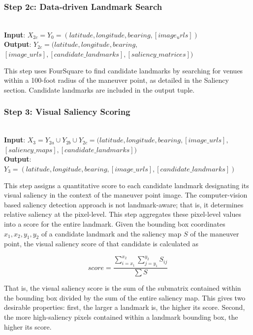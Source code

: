 \subsubsection*{Step 2c: Data-driven Landmark Search}~\\
\textbf{Input}: $X_{2c} = Y_0 = (latitude, longitude, bearing, [image_urls])$\\
\noindent\textbf{Output}: $Y_{2c} = (latitude, longitude, bearing,$ \\ $[image\_urls], [candidate\_landmarks], [saliency\_matrices] )$

This step uses FourSquare to find candidate landmarks by searching for venues within a 100-foot radius of the maneuver point, as detailed in the Saliency section. Candidate landmarks are included in the output tuple.

\subsubsection*{Step 3: Visual Saliency Scoring}~\\
\textbf{Input}: $X_3 = Y_{2a} \cup Y_{2b} \cup Y_{2c} = (latitude, longitude, bearing,  [image\_urls],$\\ $[saliency\_maps], [candidate\_landmarks] )$\\
\noindent\textbf{Output}: $Y_3 = (latitude, longitude, bearing,  [image\_urls], [candidate\_landmarks] )$ 

This step assigns a quantitative score to each candidate landmark designating its visual saliency in the context of the maneuver point image. The computer-vision based saliency detection approach is not landmark-aware; that is, it determines relative saliency at the pixel-level. This step aggregates these pixel-level values into a score for the entire landmark. Given the bounding box coordinates $x_1, x_2, y_1,y_2$ of a candidate landmark and the saliency map $S$ of the maneuver point, the visual saliency score of that candidate is calculated as

\begin{equation}
    score= \frac{\sum\limits_{i=x_1}^{x_2} \sum\limits_{j=y_1}^{y_2} S_{ij}}{\sum S}
\end{equation}

That is, the visual saliency score is the sum of the submatrix contained within the bounding box divided by the sum of the entire saliency map. This gives two desirable properties: first, the larger a landmark is, the higher its score. Second, the more high-saliency pixels contained within a landmark bounding box, the higher its score.

